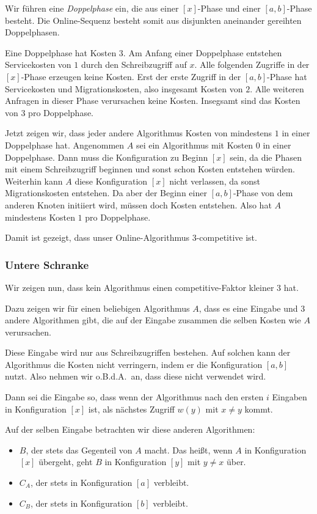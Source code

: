 \documentclass{panikzettel}
\begin{document}
Wir führen eine \emph{Doppelphase} ein, die aus einer $[x]$-Phase und einer $[a,b]$-Phase besteht. Die Online-Sequenz besteht somit aus disjunkten aneinander gereihten Doppelphasen.

Eine Doppelphase hat Kosten $3$. Am Anfang einer Doppelphase entstehen Servicekosten von $1$ durch den Schreibzugriff auf $x$. Alle folgenden Zugriffe in der $[x]$-Phase erzeugen keine Kosten. Erst der erste Zugriff in der $[a,b]$-Phase hat Servicekosten und Migrationskosten, also insgesamt Kosten von $2$. Alle weiteren Anfragen in dieser Phase verursachen keine Kosten. Insegsamt sind das Kosten von $3$ pro Doppelphase.

Jetzt zeigen wir, dass jeder andere Algorithmus Kosten von mindestens $1$ in einer Doppelphase hat. Angenommen $A$ sei ein Algorithmus mit Kosten $0$ in einer Doppelphase. Dann muss die Konfiguration zu Beginn $[x]$ sein, da die Phasen mit einem Schreibzugriff beginnen und sonst schon Kosten entstehen würden. Weiterhin kann $A$ diese Konfiguration $[x]$ nicht verlassen, da sonst Migrationskosten entstehen. Da aber der Beginn einer $[a,b]$-Phase von dem anderen Knoten initiiert wird, müssen doch Kosten entstehen. Also hat $A$ mindestens Kosten $1$ pro Doppelphase.

Damit ist gezeigt, dass unser Online-Algorithmus $3$-competitive ist.

\subsubsection{Untere Schranke}

Wir zeigen nun, dass kein Algorithmus einen competitive-Faktor kleiner $3$ hat.

Dazu zeigen wir für einen beliebigen Algorithmus $A$, dass es eine Eingabe und $3$ andere Algorithmen gibt, die auf der Eingabe zusammen die selben Kosten wie $A$ verursachen.

Diese Eingabe wird nur aus Schreibzugriffen bestehen. Auf solchen kann der Algorithmus die Kosten nicht verringern, indem er die Konfiguration $[a,b]$ nutzt. Also nehmen wir o.B.d.A.\ an, dass diese nicht verwendet wird.

Dann sei die Eingabe so, dass wenn der Algorithmus nach den ersten $i$ Eingaben in Konfiguration $[x]$ ist, als nächstes Zugriff $w(y)$ mit $x \ne y$ kommt.

Auf der selben Eingabe betrachten wir diese anderen Algorithmen:
\begin{itemize}
    \item $B$, der stets das Gegenteil von $A$ macht. Das heißt, wenn $A$ in Konfiguration $[x]$ übergeht, geht $B$ in Konfiguration $[y]$ mit $y \ne x$ über.
    \item $C_A$, der stets in Konfiguration $[a]$ verbleibt.
    \item $C_B$, der stets in Konfiguration $[b]$ verbleibt.
\end{itemize}
\end{document}

